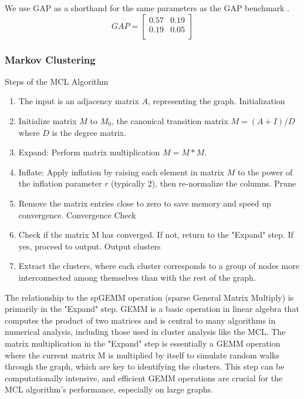 \documentclass{article}
\newcommand {\hrl}[1]{{\color{cyan}\sf{[Hengrui: #1]}}}
\begin{document}
	We use GAP as a shorthand for the same parameters as the GAP benchmark \cite{beamer_gap_2017}.
	\[
	GAP = \left[\begin{array}{cc}
		0.57 & 0.19 \\
		0.19 & 0.05 \\
	\end{array}\right]
	\]
\subsubsection{Markov Clustering}
Steps of the MCL Algorithm
\begin{enumerate}

\item The input is an adjacency matrix $A$, representing the graph.
Initialization

\item Initialize matrix $M$ to $M_0$, the canonical transition matrix $M = (A + I) / D$ where $D$ is the degree matrix.


\item Expand: Perform matrix multiplication $M = M * M$.


\item Inflate: Apply inflation by raising each element in matrix $M$ to the power of the inflation parameter $r$ (typically 2), then re-normalize the columns.
Prune

\item Remove the matrix entries close to zero to save memory and speed up convergence.
Convergence Check

\item Check if the matrix M has converged. If not, return to the "Expand" step. If yes, proceed to output.
Output clusters

\item Extract the clusters, where each cluster corresponds to a group of nodes more interconnected among themselves than with the rest of the graph.
     
\end{enumerate}
The relationship to the spGEMM operation (sparse General Matrix Multiply) is primarily in the "Expand" step. GEMM is a basic operation in linear algebra that computes the product of two matrices and is central to many algorithms in numerical analysis, including those used in cluster analysis like the MCL. The matrix multiplication in the "Expand" step is essentially a GEMM operation where the current matrix M is multiplied by itself to simulate random walks through the graph, which are key to identifying the clusters. This step can be computationally intensive, and efficient GEMM operations are crucial for the MCL algorithm's performance, especially on large graphs.
\end{document}
